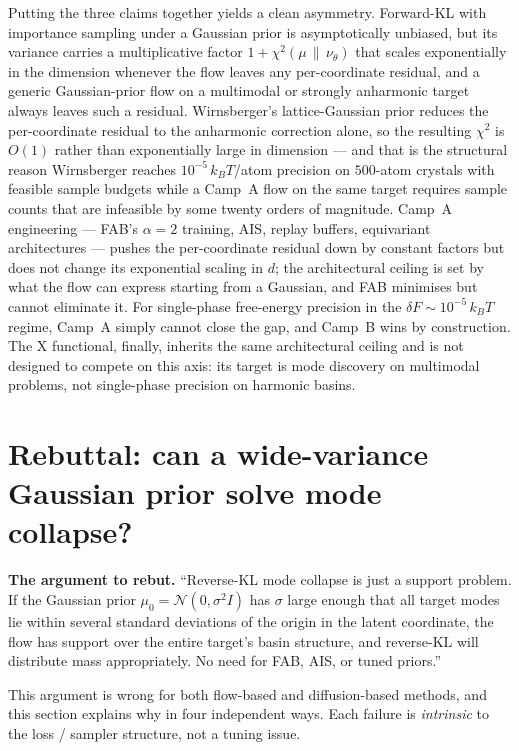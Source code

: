 \documentclass[11pt,letterpaper]{article}
\theoremstyle{plain}
\begin{document}
Putting the three claims together yields a clean asymmetry. Forward-KL with
importance sampling under a Gaussian prior is asymptotically unbiased, but
its variance carries a multiplicative factor $1+\chi^2(\mu\,\|\,\nu_\theta)$
that scales exponentially in the dimension whenever the flow leaves any
per-coordinate residual, and a generic Gaussian-prior flow on a multimodal
or strongly anharmonic target always leaves such a residual. Wirnsberger's
lattice-Gaussian prior reduces the per-coordinate residual to the anharmonic
correction alone, so the resulting $\chi^2$ is $O(1)$ rather than
exponentially large in dimension --- and that is the structural reason
Wirnsberger reaches $10^{-5}\,k_BT$/atom precision on $500$-atom crystals
with feasible sample budgets while a Camp~A flow on the same target requires
sample counts that are infeasible by some twenty orders of magnitude.
Camp~A engineering --- FAB's $\alpha=2$ training, AIS, replay buffers,
equivariant architectures --- pushes the per-coordinate residual down by
constant factors but does not change its exponential scaling in $d$; the
architectural ceiling is set by what the flow can express starting from a
Gaussian, and FAB minimises but cannot eliminate it. For single-phase
free-energy precision in the $\delta F\sim 10^{-5}\,k_BT$ regime, Camp~A
simply cannot close the gap, and Camp~B wins by construction. The
$\mathrm{X}$ functional, finally, inherits the same architectural ceiling
and is not designed to compete on this axis: its target is mode discovery
on multimodal problems, not single-phase precision on harmonic basins.

\section{Rebuttal: can a wide-variance Gaussian prior solve mode collapse?}\label{sec:wide-gaussian}

\begin{callout}
\textbf{The argument to rebut.} ``Reverse-KL mode collapse is just a support
problem. If the Gaussian prior $\mu_0 = \mathcal N(0,\sigma^2 I)$ has $\sigma$
large enough that all target modes lie within several standard deviations of
the origin in the latent coordinate, the flow has support over the entire
target's basin structure, and reverse-KL will distribute mass appropriately.
No need for FAB, AIS, or tuned priors.''

This argument is wrong for both flow-based and diffusion-based methods, and
this section explains why in four independent ways. Each failure is
\emph{intrinsic} to the loss / sampler structure, not a tuning issue.
\end{callout}
\end{document}
